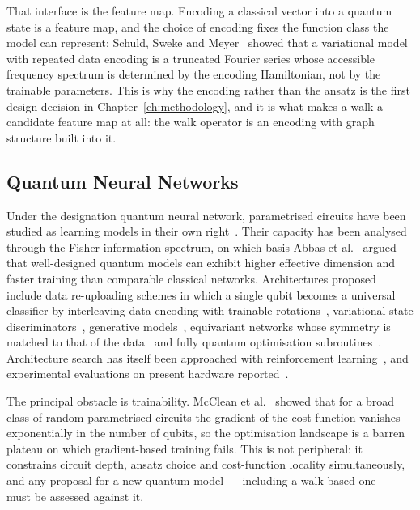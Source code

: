 That interface is the feature map. Encoding a classical vector into a quantum
state is a feature map, and the choice of encoding fixes the function class the
model can represent: Schuld, Sweke and Meyer~\cite{Schuld_2021a} showed that a
variational model with repeated data encoding is a truncated Fourier series
whose accessible frequency spectrum is determined by the encoding Hamiltonian,
not by the trainable parameters. This is why the encoding rather than the ansatz
is the first design decision in Chapter~\ref{ch:methodology}, and it is what
makes a walk a candidate feature map at all: the walk operator is an encoding
with graph structure built into it.

\subsection{Quantum Neural Networks}
\label{sec:lr-qnn}
Under the designation quantum neural network, parametrised circuits have been
studied as learning models in their own right~\cite{Beer_2022, Zhou_2023}. Their
capacity has been analysed through the Fisher information spectrum, on which
basis Abbas et al.~\cite{Abbas_2021} argued that well-designed quantum models
can exhibit higher effective dimension and faster training than comparable
classical networks. Architectures proposed include data re-uploading schemes in
which a single qubit becomes a universal classifier by interleaving data
encoding with trainable rotations~\cite{PrezSalinas_2019}, variational state
discriminators~\cite{Lee_2023}, generative models~\cite{Gao_2018}, equivariant
networks whose symmetry is matched to that of the data~\cite{Nguyen_2024} and
fully quantum optimisation subroutines~\cite{Chen_2024b}. Architecture search
has itself been approached with reinforcement learning~\cite{Rapp_2024}, and
experimental evaluations on present hardware reported~\cite{Simoes_2023}.

The principal obstacle is trainability. McClean et al.~\cite{McClean_2018}
showed that for a broad class of random parametrised circuits the gradient of
the cost function vanishes exponentially in the number of qubits, so the
optimisation landscape is a barren plateau on which gradient-based training
fails. This is not peripheral: it constrains circuit depth, ansatz choice and
cost-function locality simultaneously, and any proposal for a new quantum model
--- including a walk-based one --- must be assessed against it.

